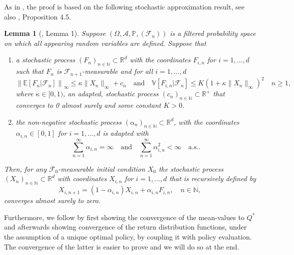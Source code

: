 \documentclass{article}
\theoremstyle{plain}
\newtheorem{lemma}[theorem]{Lemma}
\theoremstyle{definition}
\theoremstyle{remark}
\begin{document}
As in \cite{hasselt2010}, the proof is based on the following stochastic approximation result, see also  \cite{bertsekasbook}, Proposition 4.5. %
\begin{lemma}[\cite{singh2000}, Lemma 1]\label{lem:stochastic approximation lemma} %
Suppose \((\Omega, \mathcal{A}, \mathbb{P}, (\mathcal{F}_n))\) is a filtered probability space on which all appearing random variables are defined. Suppose that

\begin{enumerate}
    \item a stochastic process \((F_n)_{n \in \mathbb{N}} \subset \mathbb{R}^d\) with the coordinates \(F_{i,n}\) for \(i = 1, \ldots, d\) such that \(F_n\) is \(\mathcal{F}_{n+1}\)-measurable and for all \(i = 1, \ldots, d\)
    \[
    \left\|\mathbb{E}[F_n | \mathcal{F}_n]\right\|_\infty \leq \kappa\|X_n\|_\infty + c_n \quad \text{and} \quad \mathbb{V}[F_{i,n} | \mathcal{F}_n] \leq K(1 + \kappa\|X_n\|_\infty)^2 \quad n \geq 1,
    \]
    where \(\kappa \in [0,1)\), an adapted, stochastic process \((c_n)_{n \in \mathbb{N}} \subset \mathbb{R}^+\) that converges to 0 almost surely and some constant \(K > 0\).

    \item the non-negative stochastic process \((\alpha_n)_{n \in \mathbb{N}} \subset \mathbb{R}^d\), with the coordinates \(\alpha_{i,n} \in [0,1]\) for \(i = 1, \ldots, d\) is adapted with
    \[
    \sum_{n=1}^{\infty} \alpha_{i,n} = \infty \quad \text{and} \quad \sum_{n=1}^{\infty} \alpha_{i,n}^2 < \infty \quad \text{a.s.}.
    \]
\end{enumerate}

Then, for any \(\mathcal{F}_0\)-measurable initial condition \(X_0\) the stochastic process \((X_n)_{n \in \mathbb{N}} \subset \mathbb{R}^d\) with coordinates \(X_{i,n}\) for \(i = 1, \ldots, d\) that is recursively defined by
\[
X_{i,n+1} = (1 - \alpha_{i,n})X_{i,n} + \alpha_{i,n}F_{i,n}, \quad n \in \mathbb{N},
\]
converges almost surely to zero.
\end{lemma}
Furthermore, we follow \cite{rowland18} by first showing the convergence of the mean-values to $Q^*$ and afterwards showing convergence of the return distribution functions, under the assumption of a unique optimal policy, by coupling it with policy evaluation. The convergence of the latter is easier to prove and we will do so at the end.
\end{document}
